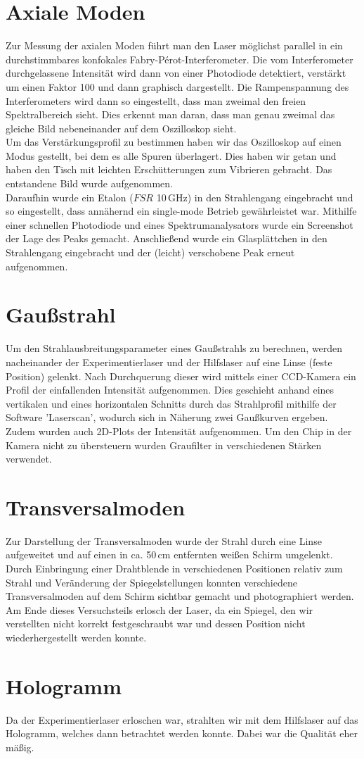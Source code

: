 \section{Axiale Moden}
Zur Messung der axialen Moden führt man den Laser möglichst parallel in ein durchstimmbares konfokales Fabry-Pérot-Interferometer. Die vom Interferometer durchgelassene Intensität wird dann von einer 
Photodiode detektiert, verstärkt um einen Faktor 100 und dann graphisch dargestellt. Die Rampenspannung des Interferometers wird dann so eingestellt, 
dass man zweimal den freien Spektralbereich sieht. Dies erkennt man daran, dass man genau zweimal das gleiche Bild nebeneinander auf dem Oszilloskop sieht. \\
Um das Verstärkungsprofil zu bestimmen haben wir das Oszilloskop auf einen Modus gestellt, bei dem es alle Spuren 
überlagert. Dies haben wir getan und haben den Tisch mit leichten Erschütterungen zum Vibrieren gebracht. Das entstandene Bild wurde aufgenommen. \\
Daraufhin wurde ein Etalon ($FSR$ 10\,GHz) in den Strahlengang eingebracht und so eingestellt, dass annähernd ein single-mode Betrieb gewährleistet war. 
Mithilfe einer schnellen Photodiode und eines Spektrumanalysators wurde ein Screenshot der Lage des Peaks gemacht. Anschließend wurde ein Glasplättchen in den Strahlengang eingebracht und der (leicht) verschobene 
Peak erneut aufgenommen.

\section{Gaußstrahl}
Um den Strahlausbreitungsparameter eines Gaußstrahls zu berechnen, werden nacheinander der Experimentierlaser und der Hilfslaser auf eine Linse (feste Position) gelenkt. Nach 
Durchquerung dieser wird mittels einer CCD-Kamera ein Profil der einfallenden Intensität aufgenommen. Dies geschieht anhand eines vertikalen und eines horizontalen Schnitts 
durch das Strahlprofil mithilfe der Software 'Laserscan', wodurch sich in Näherung zwei Gaußkurven ergeben. Zudem wurden auch 2D-Plots der Intensität aufgenommen. 
Um den Chip in der Kamera nicht zu übersteuern wurden Graufilter in verschiedenen Stärken verwendet.

\section{Transversalmoden}
Zur Darstellung der Transversalmoden wurde der Strahl durch eine Linse aufgeweitet und auf einen in ca. 50\,cm entfernten weißen Schirm umgelenkt. Durch Einbringung einer Drahtblende in verschiedenen Positionen relativ zum Strahl und Veränderung der 
Spiegelstellungen konnten verschiedene Transversalmoden auf dem Schirm sichtbar gemacht und photographiert werden. Am Ende dieses Versuchsteils erlosch der Laser, da ein Spiegel, 
den wir verstellten nicht korrekt festgeschraubt war und dessen Position nicht wiederhergestellt werden konnte.

\section{Hologramm}
Da der Experimentierlaser erloschen war, strahlten wir mit dem Hilfslaser auf das Hologramm, welches dann betrachtet werden konnte. Dabei war die Qualität eher mäßig.
